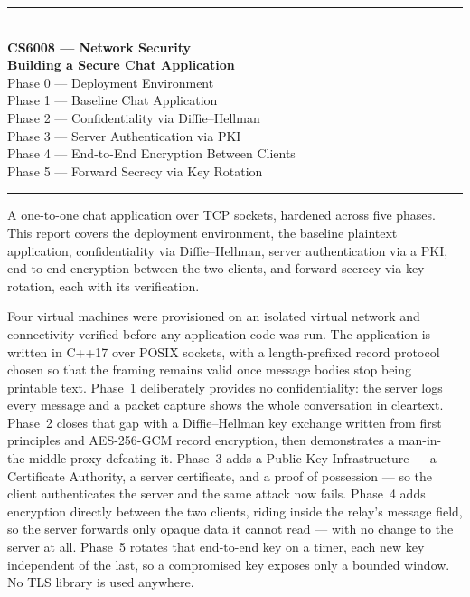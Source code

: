 \documentclass[11pt,a4paper]{article}
\begin{document}
\begin{titlepage}
\centering
\vspace*{2.2cm}

{\color{accentlt}\rule{\textwidth}{1.2pt}}\\[10pt]
{\sffamily\Large\bfseries\color{accent} CS6008 --- Network Security}\\[10pt]
{\sffamily\huge\bfseries Building a Secure Chat Application}\\[12pt]
{\sffamily\large Phase 0 --- Deployment Environment\\[2pt]
 Phase 1 --- Baseline Chat Application\\[2pt]
 Phase 2 --- Confidentiality via Diffie--Hellman\\[2pt]
 Phase 3 --- Server Authentication via PKI\\[2pt]
 Phase 4 --- End-to-End Encryption Between Clients\\[2pt]
 Phase 5 --- Forward Secrecy via Key Rotation}\\[10pt]
{\color{accentlt}\rule{\textwidth}{1.2pt}}

\vspace{1.6cm}

\begin{minipage}{0.86\textwidth}
\small
\noindent
A one-to-one chat application over TCP sockets, hardened across five phases. This report covers
the deployment environment, the baseline plaintext application, confidentiality via Diffie--Hellman,
server authentication via a PKI, end-to-end encryption between the two clients, and forward secrecy via key rotation, each
with its verification.

\medskip
\noindent
Four virtual machines were provisioned on an isolated virtual network and connectivity verified before
any application code was run. The application is written in C++17 over POSIX sockets, with a
length-prefixed record protocol chosen so that the framing remains valid once message bodies stop
being printable text. Phase~1 deliberately provides no confidentiality: the server logs every message
and a packet capture shows the whole conversation in cleartext. Phase~2 closes that gap with a
Diffie--Hellman key exchange written from first principles and AES-256-GCM record encryption, then
demonstrates a man-in-the-middle proxy defeating it. Phase~3 adds a Public Key Infrastructure --- a
Certificate Authority, a server certificate, and a proof of possession --- so the client authenticates
the server and the same attack now fails. Phase~4 adds encryption directly between the two clients,
riding inside the relay's message field, so the server forwards only opaque data it cannot read ---
with no change to the server at all. Phase~5 rotates that end-to-end key on a timer, each new key
independent of the last, so a compromised key exposes only a bounded window. No TLS library is used
anywhere.
\end{minipage}


\end{titlepage}
\end{document}
